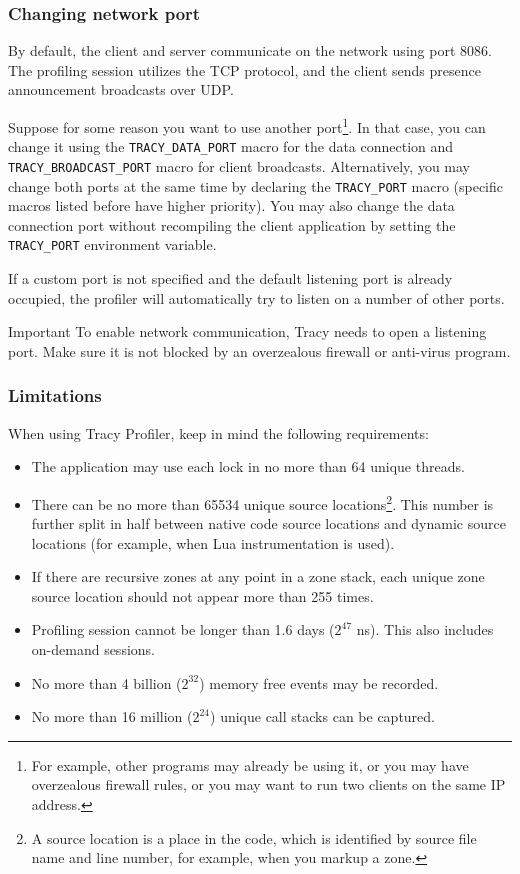 \documentclass[hidelinks,titlepage,a4paper]{article}
\begin{document}
\subsubsection{Changing network port}

By default, the client and server communicate on the network using port 8086. The profiling session utilizes the TCP protocol, and the client sends presence announcement broadcasts over UDP.

Suppose for some reason you want to use another port\footnote{For example, other programs may already be using it, or you may have overzealous firewall rules, or you may want to run two clients on the same IP address.}. In that case, you can change it using the \texttt{TRACY\_DATA\_PORT} macro for the data connection and \texttt{TRACY\_BROADCAST\_PORT} macro for client broadcasts. Alternatively, you may change both ports at the same time by declaring the \texttt{TRACY\_PORT} macro (specific macros listed before have higher priority). You may also change the data connection port without recompiling the client application by setting the \texttt{TRACY\_PORT} environment variable.

If a custom port is not specified and the default listening port is already occupied, the profiler will automatically try to listen on a number of other ports.

\begin{bclogo}[
noborder=true,
couleur=black!5,
logo=\bcbombe
]{Important}
To enable network communication, Tracy needs to open a listening port. Make sure it is not blocked by an overzealous firewall or anti-virus program.
\end{bclogo}

\subsubsection{Limitations}

When using Tracy Profiler, keep in mind the following requirements:

\begin{itemize}
\item The application may use each lock in no more than 64 unique threads.
\item There can be no more than 65534 unique source locations\footnote{A source location is a place in the code, which is identified by source file name and line number, for example, when you markup a zone.}. This number is further split in half between native code source locations and dynamic source locations (for example, when Lua instrumentation is used).
\item If there are recursive zones at any point in a zone stack, each unique zone source location should not appear more than 255 times.
\item Profiling session cannot be longer than 1.6 days ($2^{47}$ \si{\nano\second}). This also includes on-demand sessions.
\item No more than 4 billion ($2^{32}$) memory free events may be recorded.
\item No more than 16 million ($2^{24}$) unique call stacks can be captured.
\end{itemize}
\end{document}
